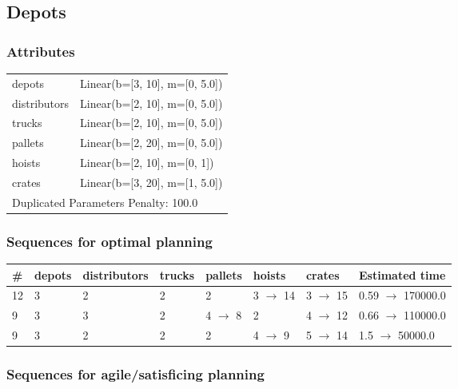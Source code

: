 \documentclass{article}
\begin{document}
                            \newpage \subsection{Depots}
                    \subsubsection*{Attributes}
                    \begin{tabular}{@{}p{}p{}@{}}
                    \toprule
                    depots & Linear(b=[3, 10], m=[0, 5.0])\\
distributors & Linear(b=[2, 10], m=[0, 5.0])\\
trucks & Linear(b=[2, 10], m=[0, 5.0])\\
pallets & Linear(b=[2, 20], m=[0, 5.0])\\
hoists & Linear(b=[2, 10], m=[0, 1])\\
crates & Linear(b=[3, 20], m=[1, 5.0]) \\
                    \bottomrule
                    \multicolumn{2}{l}{Duplicated Parameters Penalty: 100.0}
                    \end{tabular}
                
                            \subsubsection*{Sequences for optimal planning}

                            \begin{center}
                            \begin{tabular}{@{}l|l|l|l|l|l|l|l@{}}
                            \# & depots & distributors & trucks & pallets & hoists & crates & Estimated time\\\midrule
                            12&3&2&2&2&3 $\rightarrow$ 14&3 $\rightarrow$ 15&0.59 $\rightarrow$ 170000.0\\
9&3&3&2&4 $\rightarrow$ 8&2&4 $\rightarrow$ 12&0.66 $\rightarrow$ 110000.0\\
9&3&2&2&2&4 $\rightarrow$ 9&5 $\rightarrow$ 14&1.5 $\rightarrow$ 50000.0
                            \end{tabular}
                            \end{center}
                    
                         \subsubsection*{Sequences for agile/satisficing planning}
\end{document}
